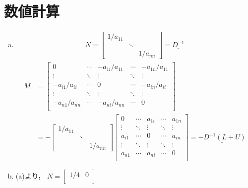 \documentclass{jsarticle}
\theoremstyle{definition}
\begin{document}
  \section{数値計算}
  \begin{enumerate}[(a)]
    \item
    \begin{align*}
      N = 
      \begin{bmatrix}
        1/a_{11} & & \\
        & \ddots & \\
        & & 1/a_{nn}
      \end{bmatrix}
      = \underline{D^{-1}}
    \end{align*}
    \begin{align*}
      M &=
      \begin{bmatrix}
        0 & \cdots & -a_{1i}/a_{11}  & \cdots & -a_{1n}/a_{11} \\
        \vdots & \ddots  & \vdots  & \ddots & \vdots \\
        -a_{i1}/a_{ii} & \cdots  & 0  & \cdots & -a_{in}/a_{ii} \\
        \vdots & \ddots &  \vdots & \ddots & \vdots \\
        -a_{n1}/a_{nn} & \cdots & -a_{ni}/a_{nn} & \cdots & 0 \\
      \end{bmatrix} \\
      &=-
      \begin{bmatrix}
        1/a_{11} & & \\
        & \ddots & \\
        & & 1/a_{nn}
      \end{bmatrix}
      \begin{bmatrix}
        0 & \cdots & a_{1i} & \cdots & a_{1n} \\
        \vdots & \ddots & \vdots & \ddots & \vdots \\
        a_{i1} & \cdots & 0  & \cdots & a_{in} \\
        \vdots & \ddots & \vdots & \ddots & \vdots \\
        a_{n1} & \cdots & a_{ni} & \cdots & 0 \\
      \end{bmatrix}
      = \underline{-D^{-1}(L+U)}
    \end{align*}
    \item (a)より，
    \begin{math}
      N=
      \begin{bmatrix}
        1/4 & 0 \\

\end{bmatrix}
\end{math}
\end{enumerate}
\end{document}
